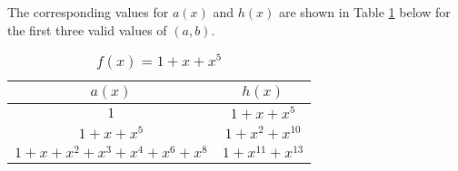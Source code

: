\begin{example}
The corresponding values for $a(x)$ and $h(x)$ are shown in Table \ref{novelTab8-b} below for the first three valid values of $(a,b)$.
\begin{table}[htbp]
 \caption{$f(x)=1+x+x^5$}
\centering
 \begin{tabular}{c c} 
 \hline
 $a(x)$ & $h(x)$\\ [0.5ex] 
 \hline\hline
$1$ & $1+x+x^{5}$\\ 
\hline
$1+x+x^5$ &  $1+x^2+x^{10}$\\
\hline
$1+x+x^2+x^3+x^4+x^{6}+x^{8}$ & $1+x^{11}+x^{13}$\\
 \end{tabular}
 \label{novelTab8-b}
\end{table}
\end{example}
 







